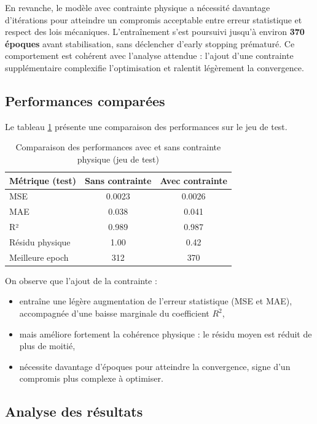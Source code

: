 \documentclass[12pt, a4paper]{report}
\begin{document}
En revanche, le modèle avec contrainte physique a nécessité davantage d’itérations pour atteindre un compromis acceptable entre erreur statistique et respect des lois mécaniques. L’entraînement s’est poursuivi jusqu’à environ \textbf{370 époques} avant stabilisation, sans déclencher d’early stopping prématuré. Ce comportement est cohérent avec l’analyse attendue : l’ajout d’une contrainte supplémentaire complexifie l’optimisation et ralentit légèrement la convergence.
\newpage
\subsection*{Performances comparées}

Le tableau \ref{tab:comparatif_pinn} présente une comparaison des performances sur le jeu de test.  

\begin{table}[H]
\centering
\caption{Comparaison des performances avec et sans contrainte physique (jeu de test)}
\label{tab:comparatif_pinn}
\begin{tabular}{|l|c|c|}
\hline
\textbf{Métrique (test)} & \textbf{Sans contrainte} & \textbf{Avec contrainte} \\
\hline
MSE & 0.0023 & 0.0026 \\
MAE & 0.038 & 0.041 \\
R² & 0.989 & 0.987 \\
Résidu physique & 1.00  & 0.42 \\
Meilleure epoch & 312 & 370 \\
\hline
\end{tabular}
\end{table}

On observe que l’ajout de la contrainte :
\begin{itemize}
    \item entraîne une légère augmentation de l’erreur statistique (MSE et MAE), accompagnée d’une baisse marginale du coefficient $R^2$,
    \item mais améliore fortement la cohérence physique : le résidu moyen est réduit de plus de moitié,
    \item nécessite davantage d’époques pour atteindre la convergence, signe d’un compromis plus complexe à optimiser.
\end{itemize}

\subsection*{Analyse des résultats}
\end{document}

